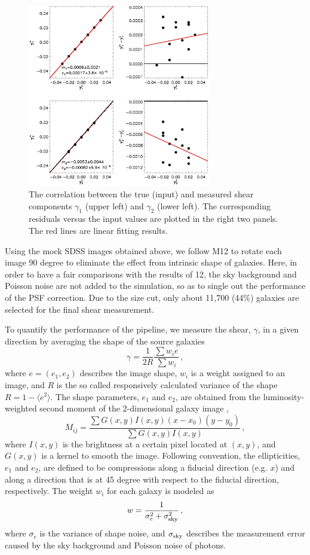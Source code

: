 \documentclass[apj]{emulateapj}
\begin{document}
\begin{figure}
\centering
\includegraphics[width=8cm]{f2.eps}
\caption{The correlation between the true (input) and measured shear 
components $\gamma_1$ (upper left) and $\gamma_2$ 
(lower left). The corresponding residuals versus the input values 
are plotted in the right two panels. The red lines are linear fitting results.}
\label{fig:shera}
\end{figure}

Using the mock SDSS images obtained above, we follow
M12 to rotate each image 90 degree to eliminate the
effect from intrinsic shape of galaxies. Here, in order to have a fair
comparisons with the results of 12, 
the sky background and Poisson noise are not added to the simulation,  
so as to single out the performance of the PSF correction. 
Due to the size cut, only about 11,700 (44\%) galaxies are 
selected for the final shear measurement.

To quantify the performance of the pipeline, we measure the
shear, $\gamma$, in a given direction by averaging the shape of the 
source galaxies
\begin{equation}
\gamma=\frac{1}{2\textit{R}}\frac{\sum w_ie}{\sum w_i}\,, 
\end{equation}
where $e=(e_1, e_2)$ describes the image shape, $w_i$ 
is a weight assigned to an image, and  $R$ is the so called 
responsively calculated variance of the shape 
$\textit{R}=1-\langle e^2\rangle$.  
The shape parameters, $e_1$ and $e_2$, are obtained from 
the luminosity-weighted second moment of the 2-dimensional
galaxy image \citep{Kaiser1995}, 
\begin{equation}
M_{ij}=\frac{\sum G(x,y) I(x,y)(x-x_0)(y-y_0)}{\sum G(x,y)I(x,y)}\,,
\end{equation}
where $I(x,y)$ is the brightness at a certain pixel located 
at $(x,y)$, and $G(x,y)$ is a kernel to smooth the image.
Following convention, the ellipticities, $e_1$ and $e_2$, 
are defined to be compressions along a fiducial direction (e.g. $x$)
and along a direction that  is at 45 degree with respect to 
the fiducial direction, respectively. The weight $w_i$ for each 
galaxy is modeled as 
\begin{equation}
w=\frac{1}{\sigma_e^2+\sigma_{\rm sky}^2}\,, 
\end{equation}
where $\sigma_e$ is the variance of shape noise, 
and $\sigma_{\rm sky}$  describes the measurement error 
caused by the sky background and Poisson noise of photons. 
\end{document}
